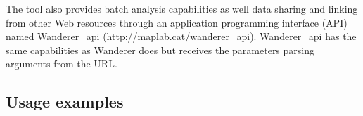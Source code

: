 \documentclass{bmcart}
\begin{document}
The tool also provides batch analysis capabilities as well data sharing and linking from other Web resources through an application programming interface (API) named Wanderer\_api (\url{http://maplab.cat/wanderer_api}). Wanderer\_api has the same capabilities as Wanderer does but receives the parameters parsing arguments from the URL.\\ 








\subsection*{Usage examples}
  
\end{document}

